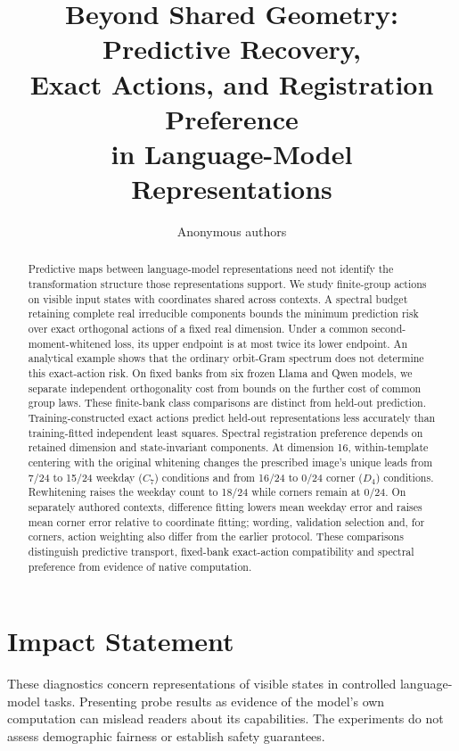 \documentclass[10pt]{article}
\title{Beyond Shared Geometry: Predictive Recovery,\\
Exact Actions, and Registration Preference\\
in Language-Model Representations}
\author{Anonymous authors}
\begin{document}
\maketitle

\begin{abstract}
Predictive maps between language-model representations need not identify the transformation structure those representations support. We study finite-group actions on visible input states with coordinates shared across contexts. A spectral budget retaining complete real irreducible components bounds the minimum prediction risk over exact orthogonal actions of a fixed real dimension. Under a common second-moment-whitened loss, its upper endpoint is at most twice its lower endpoint. An analytical example shows that the ordinary orbit-Gram spectrum does not determine this exact-action risk. On fixed banks from six frozen Llama and Qwen models, we separate independent orthogonality cost from bounds on the further cost of common group laws. These finite-bank class comparisons are distinct from held-out prediction. Training-constructed exact actions predict held-out representations less accurately than training-fitted independent least squares. Spectral registration preference depends on retained dimension and state-invariant components. At dimension 16, within-template centering with the original whitening changes the prescribed image's unique leads from 7/24 to 15/24 weekday ($C_7$) conditions and from 16/24 to 0/24 corner ($D_4$) conditions. Rewhitening raises the weekday count to 18/24 while corners remain at 0/24. On separately authored contexts, difference fitting lowers mean weekday error and raises mean corner error relative to coordinate fitting; wording, validation selection and, for corners, action weighting also differ from the earlier protocol. These comparisons distinguish predictive transport, fixed-bank exact-action compatibility and spectral preference from evidence of native computation.
\end{abstract}








\FloatBarrier
\label{sec:main-end}

\section*{Impact Statement}
These diagnostics concern representations of visible states in controlled language-model tasks. Presenting probe results as evidence of the model's own computation can mislead readers about its capabilities. The experiments do not assess demographic fairness or establish safety guarantees.
\end{document}

